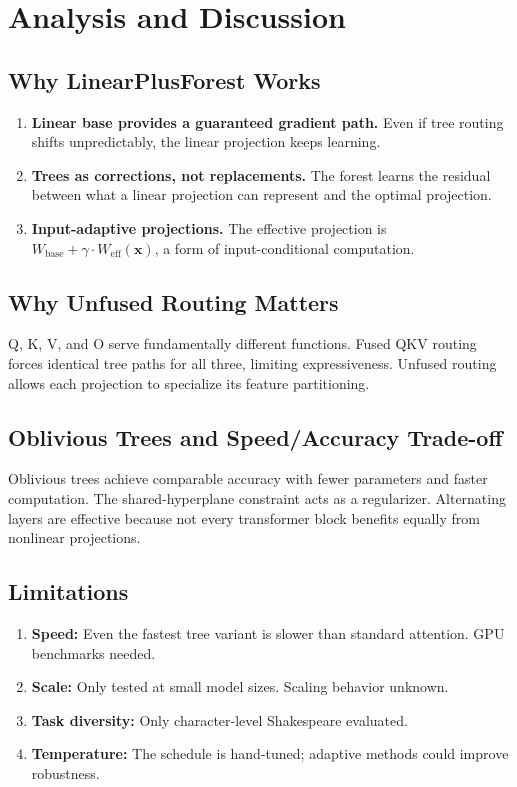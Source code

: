 \documentclass[11pt,a4paper]{article}
\begin{document}
\section{Analysis and Discussion}

\subsection{Why LinearPlusForest Works}

\begin{enumerate}
    \item \textbf{Linear base provides a guaranteed gradient path.} Even if tree routing shifts unpredictably, the linear projection keeps learning.
    \item \textbf{Trees as corrections, not replacements.} The forest learns the residual between what a linear projection can represent and the optimal projection.
    \item \textbf{Input-adaptive projections.} The effective projection is $W_{\text{base}} + \gamma \cdot W_{\text{eff}}(\mathbf{x})$, a form of input-conditional computation.
\end{enumerate}

\subsection{Why Unfused Routing Matters}

Q, K, V, and O serve fundamentally different functions. Fused QKV routing forces identical tree paths for all three, limiting expressiveness. Unfused routing allows each projection to specialize its feature partitioning.

\subsection{Oblivious Trees and Speed/Accuracy Trade-off}

Oblivious trees achieve comparable accuracy with fewer parameters and faster computation. The shared-hyperplane constraint acts as a regularizer. Alternating layers are effective because not every transformer block benefits equally from nonlinear projections.

\subsection{Limitations}

\begin{enumerate}
    \item \textbf{Speed:} Even the fastest tree variant is slower than standard attention. GPU benchmarks needed.
    \item \textbf{Scale:} Only tested at small model sizes. Scaling behavior unknown.
    \item \textbf{Task diversity:} Only character-level Shakespeare evaluated.
    \item \textbf{Temperature:} The schedule is hand-tuned; adaptive methods could improve robustness.
\end{enumerate}
\end{document}
